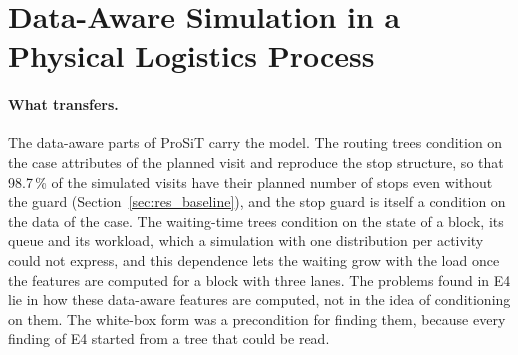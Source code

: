 \section{Data-Aware Simulation in a Physical Logistics Process}
\label{sec:disc_transfer}

\paragraph{What transfers.} The data-aware parts of ProSiT carry the model. The
routing trees condition on the case attributes of the planned visit and reproduce the
stop structure, so that 98.7\,\% of the simulated visits have their planned number of
stops even without the guard (Section~\ref{sec:res_baseline}), and the stop guard is
itself a condition on the data of the case. The waiting-time trees condition on the
state of a block, its queue and its workload, which a simulation with one distribution
per activity could not express, and this dependence lets the waiting grow with the
load once the features are computed for a block with three lanes. The problems found
in E4 lie in how these data-aware features are computed, not in the idea of
conditioning on them. The white-box form was a precondition for finding them, because
every finding of E4 started from a tree that could be read.

